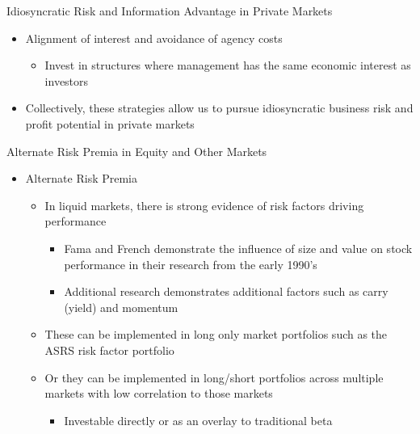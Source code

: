 \documentclass[10pt,english]{beamer}\usepackage[]{graphicx}\usepackage[]{color}
\begin{document}
\begin{frame}{Idiosyncratic Risk and Information Advantage in Private Markets}
\begin{itemize}
\begin{itemize}
\begin{itemize}
{mind and generate value by executing that plan}{\footnotesize \par}
\item {\footnotesize{}Requires long term orientation and control over management}{\footnotesize \par}
\item {\footnotesize{}Often requires specialized expertise in markets or
processes}{\footnotesize \par}
\end{itemize}
\end{itemize}
\item {\footnotesize{}Alignment of interest and avoidance of agency costs}{\footnotesize \par}
\begin{itemize}
\item {\footnotesize{}Invest in structures where management has the same
economic interest as investors }{\footnotesize \par}
\end{itemize}
\item {\footnotesize{}Collectively, these strategies allow us to pursue
idiosyncratic business risk and profit potential in private markets}{\footnotesize \par}
\end{itemize}
\end{frame}
%
\begin{frame}{Alternate Risk Premia in Equity and Other Markets}
 
\begin{itemize}
\item Alternate Risk Premia
\begin{itemize}
\item In liquid markets, there is strong evidence of risk factors driving
performance
\begin{itemize}
\item Fama and French demonstrate the influence of size and value on stock
performance in their research from the early 1990's
\item Additional research demonstrates additional factors such as carry
(yield) and momentum
\end{itemize}
\item These can be implemented in long only market portfolios such as the
ASRS risk factor portfolio
\item Or they can be implemented in long/short portfolios across multiple
markets with low correlation to those markets
\begin{itemize}
\item Investable directly or as an overlay to traditional beta 
\end{itemize}
\end{itemize}
\end{itemize}
\end{frame}
\end{document}
